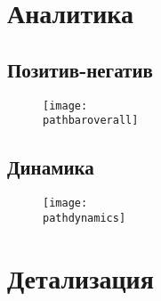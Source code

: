 
    \chapter{Аналитика}

        \section{Позитив-негатив}
        \newcommand{\pathbaroverall}{\VAR{bar_overall}}
        \begin{figure}[H]
            \centering\texttt{[image: \\pathbaroverall]}
        \end{figure}

    \section{Динамика}
    \newcommand{\pathdynamics}{\VAR{dynamics.dynamics}}
    \begin{figure}[H]
        \centering\texttt{[image: \\pathdynamics]}
    \end{figure}


    \chapter{Детализация}
